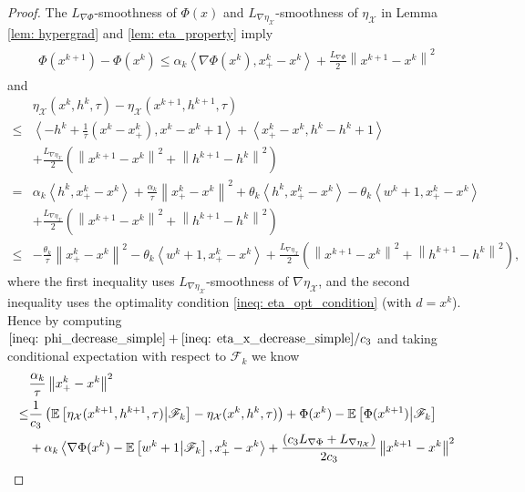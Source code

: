 \documentclass[10pt]{article}
\theoremstyle{remark}
\newcommand{\cX}{\mathcal{X}}
\def\setF{\mathscr{F}} %
\newcommand{\E}{\mathbb{E}}
\newcommand{\norm}[1]{\left\|#1\right\|}
\def\<#1,#2>{\left\langle #1,#2\right\rangle}
\begin{document}
\begin{proof}
    The $L_{\nabla \Phi}$-smoothness of $\Phi(x)$ and $L_{\nabla\eta_{\cX}}$-smoothness of $\eta_{\cX}$ in Lemma \ref{lem: hypergrad} and \ref{lem: eta_property} imply
\begin{align}\label{ineq: phi_decrease_simple}
    \begin{aligned}
        \Phi(x^{k+1}) - \Phi(x^k)\leq\alpha_k\<\nabla \Phi(x^k), x_+^k - x^k> + \frac{L_{\nabla \Phi}}{2}\norm{x^{k+1}-x^k}^2
    \end{aligned}
\end{align}
and
\begin{equation}\label{ineq: eta_x_decrease_simple}
    \begin{aligned}
        &\eta_{\cX}(x^k,h^k,\tau) - \eta_{\cX}(x^{k+1},h^{k+1},\tau)\\
        \leq & \<-h^k + \frac{1}{\tau}(x^k - x_+^k), x^k - x^{k+1}> + \<x_+^k - x^k, h^k - h^{k+1}> \\
        &+ \frac{L_{\nabla\eta_{\cX}}}{2}\left(\norm{x^{k+1}-x^k}^2 + \norm{h^{k+1} - h^k}^2\right)\\
        = &\alpha_k\<h^k, x_+^k - x^k> + \frac{\alpha_k}{\tau}\norm{x_+^k - x^k}^2 +\theta_k\<h^k, x_+^k - x^k> - \theta_k\<w^{k+1}, x_+^k - x^k> \\
         & + \frac{L_{\nabla\eta_{\cX}}}{2}\left(\norm{x^{k+1}-x^k}^2 + \norm{h^{k+1} - h^k}^2\right)\\
    \leq &- \frac{\theta_k}{\tau}\norm{x_+^k - x^k}^2 - \theta_k\<w^{k+1}, x_+^k-x^k> + \frac{L_{\nabla\eta_{\cX}}}{2}\left(\norm{x^{k+1}-x^k}^2 + \norm{h^{k+1} - h^k}^2\right),
    \end{aligned}
\end{equation}
where the first inequality uses $L_{\nabla\eta_{\cX}}$-smoothness of $\nabla \eta_{\cX}$, and the second inequality uses the optimality condition \eqref{ineq: eta_opt_condition} (with $d = x^k$). Hence by computing $\eqref{ineq: phi_decrease_simple} + \eqref{ineq: eta_x_decrease_simple}/ c_3$ and taking conditional expectation with respect to $\setF_k$ we know
\begin{align}
    &\frac{\alpha_k}{\tau}\norm{x_+^k-x^k}^2\notag \\
    \leq &\frac{1}{c_3}\left(\E\left[\eta_{\cX}(x^{k+1},h^{k+1},\tau)\middle|\setF_k\right] - \eta_{\cX}(x^k,h^k,\tau)\right) + \Phi(x^k) - \E\left[\Phi(x^{k+1})\middle|\setF_k\right] \notag\\
     &+ \alpha_k\<\nabla\Phi(x^k) - \E\left[w^{k+1}\middle|\setF_k\right], x_+^k - x^k> + \frac{\left(c_3L_{\nabla \Phi} + L_{\nabla\eta_{\cX}}\right)}{2c_3}\norm{x^{k+1}-x^k}^2 \notag\\

\end{align}
\end{proof}
\end{document}
